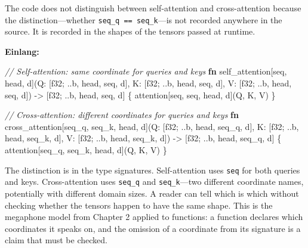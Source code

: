 \documentclass[11pt,titlepage]{article}
\newenvironment{Shaded}{}{}
\newcommand{\CommentTok}[1]{\textcolor[rgb]{0.38,0.63,0.69}{\textit{#1}}}
\newcommand{\DataTypeTok}[1]{\textcolor[rgb]{0.56,0.13,0.00}{#1}}
\newcommand{\KeywordTok}[1]{\textcolor[rgb]{0.00,0.44,0.13}{\textbf{#1}}}
\newcommand{\NormalTok}[1]{#1}
\newcommand{\OperatorTok}[1]{\textcolor[rgb]{0.40,0.40,0.40}{#1}}
\begin{document}
The code does not distinguish between self-attention and cross-attention
because the distinction---whether \texttt{seq\_q\ ==\ seq\_k}---is not
recorded anywhere in the source. It is recorded in the shapes of the
tensors passed at runtime.

\textbf{Einlang:}

\begin{Shaded}
\begin{Highlighting}[]
\CommentTok{// Self-attention: same coordinate for queries and keys}
\KeywordTok{fn}\NormalTok{ self_attention[seq, head, d](Q: }\OperatorTok{[}\DataTypeTok{f32}\NormalTok{; ..b, head, seq, d}\OperatorTok{]}\NormalTok{, K: }\OperatorTok{[}\DataTypeTok{f32}\NormalTok{; ..b, head, seq, d}\OperatorTok{]}\NormalTok{, V: }\OperatorTok{[}\DataTypeTok{f32}\NormalTok{; ..b, head, seq, d}\OperatorTok{]}\NormalTok{)}
\NormalTok{    -> }\OperatorTok{[}\DataTypeTok{f32}\NormalTok{; ..b, head, seq, d}\OperatorTok{]}
\OperatorTok{\{}
\NormalTok{    attention}\OperatorTok{[}\NormalTok{seq, seq, head, d}\OperatorTok{]}\NormalTok{(Q, K, V)}
\OperatorTok{\}}

\CommentTok{// Cross-attention: different coordinates for queries and keys}
\KeywordTok{fn}\NormalTok{ cross_attention[seq_q, seq_k, head, d](Q: }\OperatorTok{[}\DataTypeTok{f32}\NormalTok{; ..b, head, seq_q, d}\OperatorTok{]}\NormalTok{, K: }\OperatorTok{[}\DataTypeTok{f32}\NormalTok{; ..b, head, seq_k, d}\OperatorTok{]}\NormalTok{, V: }\OperatorTok{[}\DataTypeTok{f32}\NormalTok{; ..b, head, seq_k, d}\OperatorTok{]}\NormalTok{)}
\NormalTok{    -> }\OperatorTok{[}\DataTypeTok{f32}\NormalTok{; ..b, head, seq_q, d}\OperatorTok{]}
\OperatorTok{\{}
\NormalTok{    attention}\OperatorTok{[}\NormalTok{seq_q, seq_k, head, d}\OperatorTok{]}\NormalTok{(Q, K, V)}
\OperatorTok{\}}
\end{Highlighting}
\end{Shaded}

The distinction is in the type signatures. Self-attention uses
\texttt{seq} for both queries and keys. Cross-attention uses
\texttt{seq\_q} and \texttt{seq\_k}---two different coordinate names,
potentially with different domain sizes. A reader can tell which is
which without checking whether the tensors happen to have the same
shape. This is the megaphone model from Chapter 2 applied to functions:
a function declares which coordinates it speaks on, and the omission of
a coordinate from its signature is a claim that must be checked.

\vspace{2em}
\end{document}
